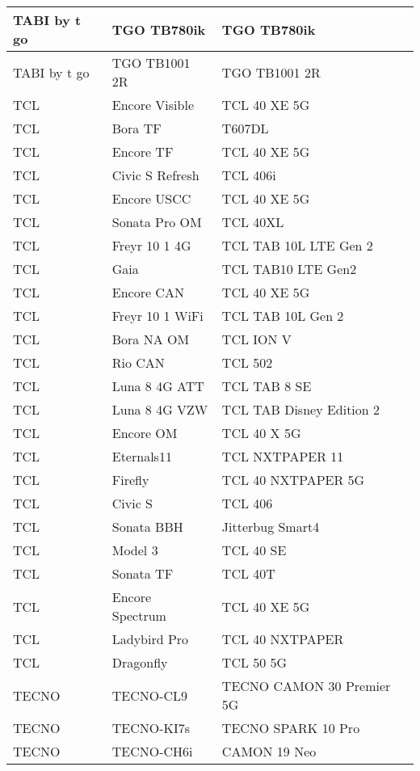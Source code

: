 \begin{tabularx}{\linewidth}{|l|X|X|}
        TABI by t go & TGO TB780ik & TGO TB780ik \\ \hline
        TABI by t go & TGO TB1001 2R & TGO TB1001 2R \\ \hline
        TCL & Encore Visible & TCL 40 XE 5G \\ \hline
        TCL & Bora TF & T607DL \\ \hline
        TCL & Encore TF & TCL 40 XE 5G \\ \hline
        TCL & Civic S Refresh & TCL 406i \\ \hline
        TCL & Encore USCC & TCL 40 XE 5G \\ \hline
        TCL & Sonata Pro OM & TCL 40XL \\ \hline
        TCL & Freyr 10 1 4G & TCL TAB 10L LTE Gen 2 \\ \hline
        TCL & Gaia & TCL TAB10 LTE Gen2 \\ \hline
        TCL & Encore CAN & TCL 40 XE 5G \\ \hline
        TCL & Freyr 10 1 WiFi & TCL TAB 10L Gen 2 \\ \hline
        TCL & Bora NA OM & TCL ION V \\ \hline
        TCL & Rio CAN & TCL 502 \\ \hline
        TCL & Luna 8 4G ATT & TCL TAB 8 SE \\ \hline
        TCL & Luna 8 4G VZW & TCL TAB Disney Edition 2 \\ \hline
        TCL & Encore OM & TCL 40 X 5G \\ \hline
        TCL & Eternals11 & TCL NXTPAPER 11 \\ \hline
        TCL & Firefly & TCL 40 NXTPAPER 5G \\ \hline
        TCL & Civic S & TCL 406 \\ \hline
        TCL & Sonata BBH & Jitterbug Smart4 \\ \hline
        TCL & Model 3 & TCL 40 SE \\ \hline
        TCL & Sonata TF & TCL 40T \\ \hline
        TCL & Encore Spectrum & TCL 40 XE 5G \\ \hline
        TCL & Ladybird Pro & TCL 40 NXTPAPER \\ \hline
        TCL & Dragonfly & TCL 50 5G \\ \hline
        TECNO & TECNO-CL9 & TECNO CAMON 30 Premier 5G \\ \hline
        TECNO & TECNO-KI7s & TECNO SPARK 10 Pro \\ \hline
        TECNO & TECNO-CH6i & CAMON 19 Neo \\ \hline

\end{tabularx}
